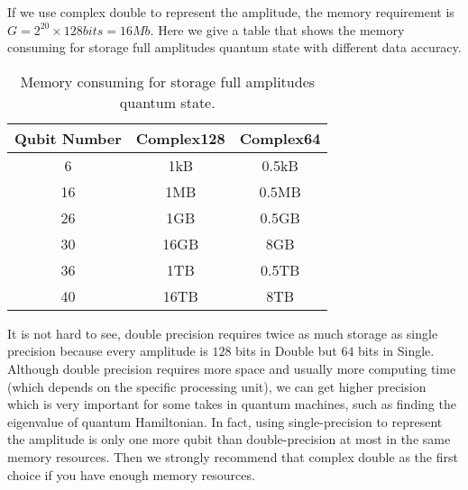 If we use complex double to represent the amplitude, the memory requirement is $G=2^{20}\times 128 bits=16 Mb$. Here we give a table that shows the memory consuming for storage full amplitudes quantum state with different data accuracy.

\begin{table}[ht]
    \begin{tabular}{ccc}
        \toprule
        Qubit Number & Complex128 & Complex64 \\
        \midrule
        6            & 1kB        & 0.5kB     \\
        16           & 1MB        & 0.5MB     \\
        26           & 1GB        & 0.5GB     \\
        30           & 16GB       & 8GB       \\
        36           & 1TB        & 0.5TB     \\
        40           & 16TB       & 8TB       \\
        \bottomrule
    \end{tabular}
    \caption{Memory consuming for storage full amplitudes quantum state.}
    \label{tab:mem_consume}
\end{table}

It is not hard to see, double precision requires twice as much storage as single precision because every amplitude is $128$ bits in Double but $64$ bits in Single.
Although double precision requires more space and usually more computing time (which depends on the specific processing unit), we can get higher precision which is very important for some takes in quantum machines, such as finding the eigenvalue of quantum Hamiltonian.
In fact, using single-precision to represent the amplitude is only one more qubit than double-precision at most in the same memory resources.
Then we strongly recommend that complex double as the first choice if you have enough memory resources.